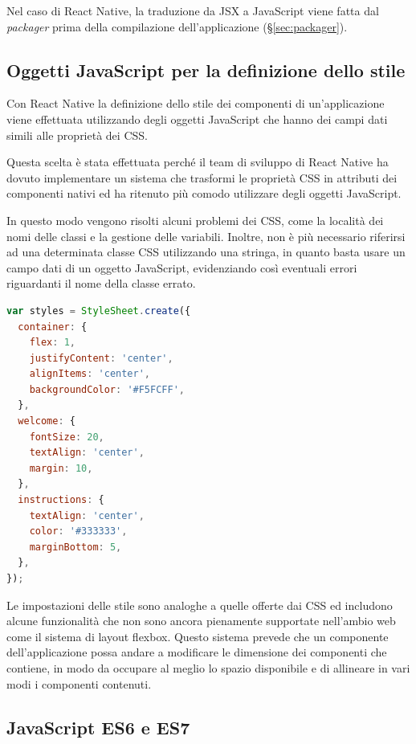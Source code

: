 Nel caso di React Native, la traduzione da JSX a JavaScript viene fatta dal \textit{packager} prima della compilazione dell'applicazione (§\ref{sec:packager}).

\subsection{Oggetti JavaScript per la definizione dello stile}

Con React Native la definizione dello stile dei componenti di un'applicazione viene effettuata utilizzando degli oggetti JavaScript che hanno dei campi dati simili alle proprietà dei CSS.

Questa scelta è stata effettuata perché il team di sviluppo di React Native ha dovuto implementare un sistema che trasformi le proprietà CSS in attributi dei componenti nativi ed ha ritenuto più comodo utilizzare degli oggetti JavaScript.

In questo modo vengono risolti alcuni problemi dei CSS, come la località dei nomi delle classi e la gestione delle variabili.
Inoltre, non è più necessario riferirsi ad una determinata classe CSS utilizzando una stringa, in quanto basta usare un campo dati di un oggetto JavaScript, evidenziando così eventuali errori riguardanti il nome della classe errato.

\begin{lstlisting}[language=JavaScript, caption=Esempio della definizione dello stile di un componente di React Native]
var styles = StyleSheet.create({
  container: {
    flex: 1,
    justifyContent: 'center',
    alignItems: 'center',
    backgroundColor: '#F5FCFF',
  },
  welcome: {
    fontSize: 20,
    textAlign: 'center',
    margin: 10,
  },
  instructions: {
    textAlign: 'center',
    color: '#333333',
    marginBottom: 5,
  },
});
\end{lstlisting}

Le impostazioni delle stile sono analoghe a quelle offerte dai CSS ed includono alcune funzionalità che non sono ancora pienamente supportate nell'ambio web come il sistema di layout flexbox.
Questo sistema prevede che un componente dell'applicazione possa andare a modificare le dimensione dei componenti che contiene, in modo da occupare al meglio lo spazio disponibile e di allineare in vari modi i componenti contenuti.

\subsection{JavaScript ES6 e ES7}


